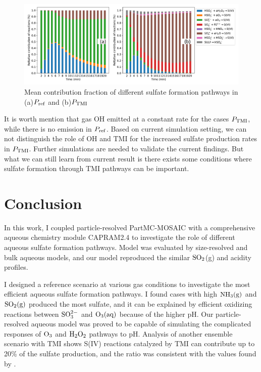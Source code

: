 \documentclass[edeposit,fullpage]{uiucthesis2009}
\begin{document}
\begin{figure}[ht]
    \centering \includegraphics[scale=0.6]{chap2_figs/chap2-TMI_contri_factors.pdf}
    \caption{Mean contribution fraction of different sulfate formation pathways in (a)$P_{\rm ref}$ and (b)$P_{\rm TMI}$}
    \label{chap2:iron-contri}
\end{figure}

It is worth mention that gas OH emitted at a constant rate for the
cases $P_{\rm TMI}$, while there is no emission in $P_{\rm
  ref}$. Based on current simulation setting, we can not distinguish
the role of OH and TMI for the increased sulfate production rates in
$P_{\rm TMI}$. Further simulations are needed to validate the current
findings. But what we can still learn from current result is there
exists some conditions where sulfate formation through TMI pathways
can be important.

\section{Conclusion}
\label{chap2.6}
In this work, I coupled particle-resolved PartMC-MOSAIC with a
comprehensive aqueous chemistry module CAPRAM2.4 to investigate the
role of different aqueous sulfate formation pathways.  Model was
evaluated by size-resolved and bulk aqueous models, and our model
reproduced the similar $\rm SO_2$(g) and acidity profiles.

I designed a reference scenario at various gas conditions to
investigate the most efficient aqueous sulfate formation pathways.  I
found cases with high $\rm NH_3(g)$ and $\rm SO_2(g)$ produced the
most sulfate, and it can be explained by efficient oxidizing reactions
between $\rm SO_3^{2-}$ and $\rm O_3(aq)$ because of the higher
pH. Our particle-resolved aqueous model was proved to be capable of
simulating the complicated responses of $\rm O_3$ and $\rm H_2O_2$
pathways to pH. Analysis of another ensemble scenario with TMI shows
S(IV) reactions catalyzed by TMI can contribute up to 20\% of the
sulfate production, and the ratio was consistent with the values found
by \citet{alexander2009transition}.
\end{document}
